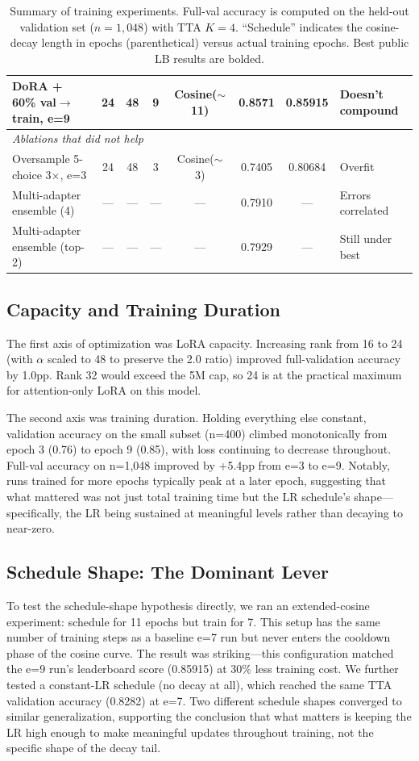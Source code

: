 \documentclass[11pt]{article}
\begin{document}
\begin{table}[t]
\begin{tabular}{lccccccl}
DoRA + 60\% val\(\to\)train, e=9   & 24 & 48 & 9 & Cosine($\sim$11) & 0.8571 & 0.85915 & Doesn't compound \\
\midrule
\multicolumn{8}{l}{\textit{Ablations that did not help}} \\
\midrule
Oversample 5-choice 3$\times$, e=3 & 24 & 48 & 3 & Cosine($\sim$3) & 0.7405 & 0.80684 & Overfit \\
Multi-adapter ensemble (4)         & --- & --- & ---       & ---  & 0.7910 & --- & Errors correlated \\
Multi-adapter ensemble (top-2)     & --- & --- & ---       & ---  & 0.7929 & --- & Still under best \\
\bottomrule
\end{tabular}
\caption{Summary of training experiments. Full-val accuracy is computed on the held-out validation set ($n{=}1{,}048$) with TTA $K{=}4$. ``Schedule'' indicates the cosine-decay length in epochs (parenthetical) versus actual training epochs. Best public LB results are bolded.}
\label{tab:experiments}
\end{table}

\subsection{Capacity and Training Duration}

The first axis of optimization was LoRA capacity. Increasing rank from 16 to 24 (with \(\alpha\) scaled to 48 to preserve the 2.0 ratio) improved full-validation accuracy by 1.0pp. Rank 32 would exceed the 5M cap, so 24 is at the practical maximum for attention-only LoRA on this model.

The second axis was training duration. Holding everything else constant, validation accuracy on the small subset (n=400) climbed monotonically from epoch 3 (0.76) to epoch 9 (0.85), with loss continuing to decrease throughout. Full-val accuracy on n=1,048 improved by +5.4pp from e=3 to e=9. Notably, runs trained for more epochs typically peak at a later epoch, suggesting that what mattered was not just total training time but the LR schedule's shape---specifically, the LR being sustained at meaningful levels rather than decaying to near-zero.

\subsection{Schedule Shape: The Dominant Lever}

To test the schedule-shape hypothesis directly, we ran an extended-cosine experiment: schedule for 11 epochs but train for 7. This setup has the same number of training steps as a baseline e=7 run but never enters the cooldown phase of the cosine curve. The result was striking---this configuration matched the e=9 run's leaderboard score (0.85915) at 30\% less training cost. We further tested a constant-LR schedule (no decay at all), which reached the same TTA validation accuracy (0.8282) at e=7. Two different schedule shapes converged to similar generalization, supporting the conclusion that what matters is keeping the LR high enough to make meaningful updates throughout training, not the specific shape of the decay tail.
\end{document}
